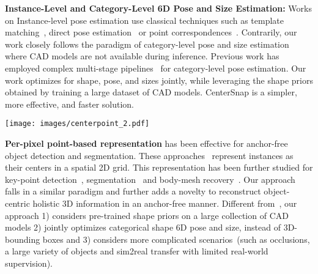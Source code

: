 \documentclass[letter, 10pt, conference]{ieeeconf}
\begin{document}
\textbf{Instance-Level and Category-Level 6D Pose and Size Estimation:} Works on Instance-level pose estimation use classical techniques such as template matching~\cite{kehl2016deep, sundermeyer2018implicit, tejani2014latent}, direct pose estimation~\cite{kehl2017ssd, wang2019densefusion, xiang2018posecnn} or point correspondences~\cite{tekin2018real, rad2017bb8}. Contrarily, our work closely follows the paradigm of category-level pose and size estimation where CAD models are not available during inference. Previous work has employed complex multi-stage pipelines~\cite{wang2019normalized,tian2020shape, chen2020learning} for category-level pose estimation. Our work optimizes for shape, pose, and sizes jointly, while leveraging the shape priors obtained by training a large dataset of CAD models. CenterSnap is a simpler, more effective, and faster solution.   
\begin{figure*}[t!]
\centering
\texttt{[image: images/centerpoint\_2.pdf]}
\vspace*{-7mm}
\label{framework}
\end{figure*}
\textbf{Per-pixel point-based representation} has been effective for anchor-free object detection and segmentation. These approaches~\cite{zhou2019objects, duan2019centernet, wang2020centermask} represent instances as their centers in a spatial 2D grid. This representation has been further studied for key-point detection~\cite{nie2019single}, segmentation~\cite{tian2020conditional,wang2020solo} and body-mesh recovery~\cite{sun2020centerhmr, ROMP}. Our approach falls in a similar paradigm and further adds a novelty to reconstruct object-centric holistic 3D information in an anchor-free manner. Different from~\cite{engelmann2021points, sun2020centerhmr}, our approach 1) considers pre-trained shape priors on a large collection of CAD models 2) jointly optimizes categorical shape 6D pose and size, instead of 3D-bounding boxes and 3) considers more complicated scenarios~(such as occlusions, a large variety of objects and sim2real transfer with limited real-world supervision).
\end{document}
